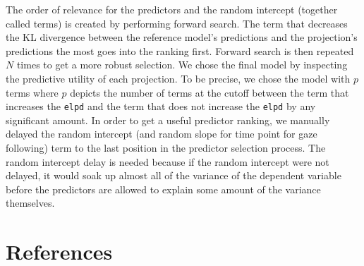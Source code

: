\documentclass[
  man,floatsintext]{apa6}
\begin{document}
The order of relevance for the predictors and the random intercept (together called terms) is created by performing forward search. The term that decreases the KL divergence between the reference model's predictions and the projection's predictions the most goes into the ranking first. Forward search is then repeated \(N\) times to get a more robust selection. We chose the final model by inspecting the predictive utility of each projection. To be precise, we chose the model with \(p\) terms where \(p\) depicts the number of terms at the cutoff between the term that increases the \texttt{elpd} and the term that does not increase the \texttt{elpd} by any significant amount. In order to get a useful predictor ranking, we manually delayed the random intercept (and random slope for time point for gaze following) term to the last position in the predictor selection process. The random intercept delay is needed because if the random intercept were not delayed, it would soak up almost all of the variance of the dependent variable before the predictors are allowed to explain some amount of the variance themselves.

\newpage

\hypertarget{references}{%
\section{References}\label{references}}

\begingroup
\setlength{\parindent}{-0.5in}
\setlength{\leftskip}{0.5in}
\end{document}
